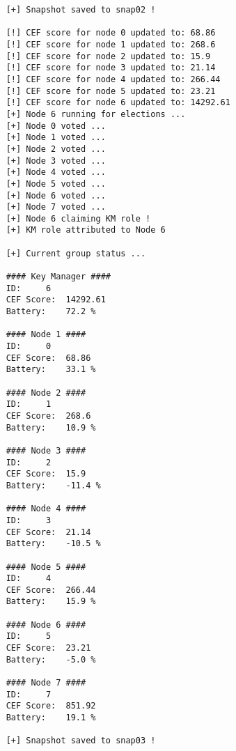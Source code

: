 \begin{verbatim}
	[+] Snapshot saved to snap02 !
	
	[!] CEF score for node 0 updated to: 68.86
	[!] CEF score for node 1 updated to: 268.6
	[!] CEF score for node 2 updated to: 15.9
	[!] CEF score for node 3 updated to: 21.14
	[!] CEF score for node 4 updated to: 266.44
	[!] CEF score for node 5 updated to: 23.21
	[!] CEF score for node 6 updated to: 14292.61
	[+] Node 6 running for elections ...
	[+] Node 0 voted ...
	[+] Node 1 voted ...
	[+] Node 2 voted ...
	[+] Node 3 voted ...
	[+] Node 4 voted ...
	[+] Node 5 voted ...
	[+] Node 6 voted ...
	[+] Node 7 voted ...
	[+] Node 6 claiming KM role !
	[+] KM role attributed to Node 6
	
	[+] Current group status ...
	
	#### Key Manager ####
	ID:		6
	CEF Score:	14292.61
	Battery:	72.2 %
	
	#### Node 1 ####
	ID:		0
	CEF Score:	68.86
	Battery:	33.1 %
	
	#### Node 2 ####
	ID:		1
	CEF Score:	268.6
	Battery:	10.9 %
	
	#### Node 3 ####
	ID:		2
	CEF Score:	15.9
	Battery:	-11.4 %
	
	#### Node 4 ####
	ID:		3
	CEF Score:	21.14
	Battery:	-10.5 %
	
	#### Node 5 ####
	ID:		4
	CEF Score:	266.44
	Battery:	15.9 %
	
	#### Node 6 ####
	ID:		5
	CEF Score:	23.21
	Battery:	-5.0 %
	
	#### Node 7 ####
	ID:		7
	CEF Score:	851.92
	Battery:	19.1 %
	
	[+] Snapshot saved to snap03 !
\end{verbatim}
%